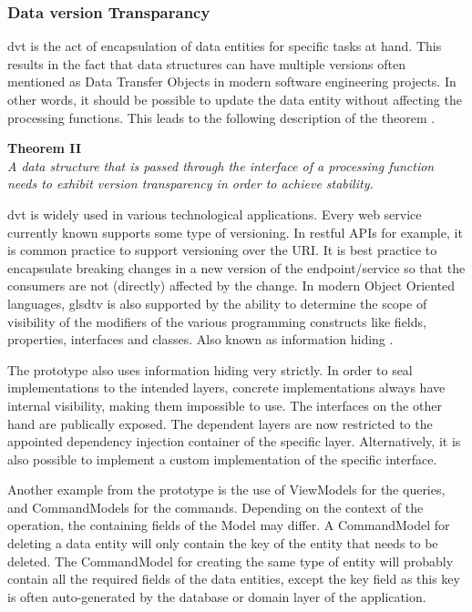 \subsubsection{Data version Transparancy}

\gls{dvt} is the act of encapsulation of data entities for specific tasks at hand. This
results in the fact that data structures can have multiple versions often mentioned as
Data Transfer Objects in modern software engineering projects. In other words, it should
be possible to update the data entity without affecting the processing functions. This
leads to the following description of the theorem \parencite[280]{mannaert_normalized_2016}.

\begin{center}
    \textbf{Theorem II}\\
    \textit{A data structure that is passed through the interface of a processing function 
    needs to exhibit version transparency in order to achieve stability.}
\end{center}

\gls{dvt} is widely used in various technological applications. Every web service
currently known supports some type of versioning. In restful APIs for example, it is
common practice to support versioning over the URI. It is best practice to encapsulate
breaking changes in a new version of the endpoint/service so that the consumers are not
(directly) affected by the change. In modern Object Oriented languages, gls{dtv} is also
supported by the ability to determine the scope of visibility of the modifiers of the
various programming constructs like fields, properties, interfaces and classes. Also known
as information hiding \parencites{parnas_criteria_1972}[278]{mannaert_normalized_2016}.

The prototype also uses information hiding very strictly. In order to seal implementations
to the intended layers, concrete implementations always have internal visibility, making
them impossible to use. The interfaces on the other hand are publically exposed. The
dependent layers are now restricted to the appointed dependency injection container of the
specific layer. Alternatively, it is also possible to implement a custom implementation of
the specific interface. 

Another example from the prototype is the use of ViewModels for the queries, and
CommandModels for the commands. Depending on the context of the operation, the containing
fields of the Model may differ. A CommandModel for deleting a data entity will only
contain the key of the entity that needs to be deleted. The CommandModel for creating the
same type of entity will probably contain all the required fields of the data entities,
except the key field as this key is often auto-generated by the database or
domain layer of the application.